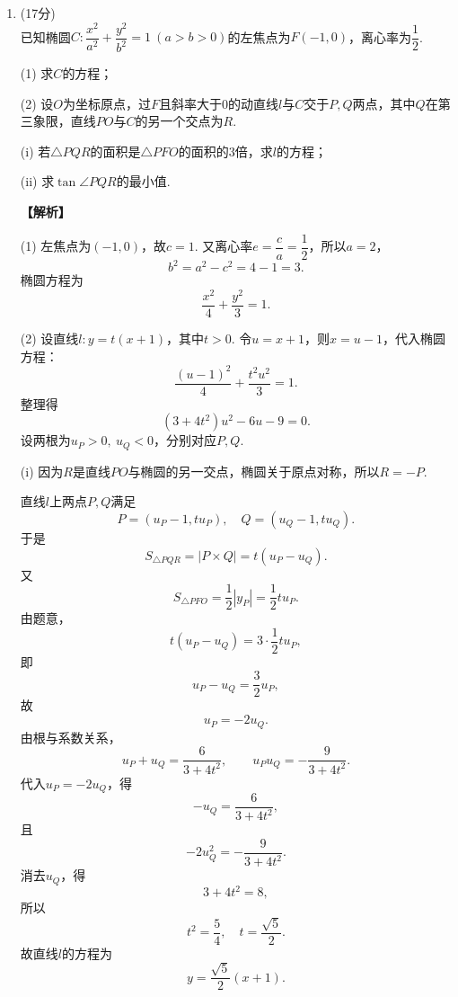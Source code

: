 \documentclass[12pt,a4paper]{article}
\begin{document}
\begin{enumerate}[leftmargin=*,label=\arabic*.,resume,itemsep=1.2ex]
		\textbf{【解析】}
		
		(1) 当$X=1,2,3$时，表示第$1,2,3$次首次投中；当$X=4$时，表示前三次均未投中. 故
		\[
		P(X=1)=\frac13,
		\]
		\[
		P(X=2)=\frac23\cdot\frac13=\frac29,
		\]
		\[
		P(X=3)=\left(\frac23\right)^2\cdot\frac13=\frac4{27},
		\]
		\[
		P(X=4)=\left(\frac23\right)^3=\frac8{27}.
		\]
		分布列为
		\[
		\begin{array}{c|cccc}
			X & 1 & 2 & 3 & 4\\ \hline
			P & \dfrac13 & \dfrac29 & \dfrac4{27} & \dfrac8{27}
		\end{array}
		\]
		
		(2)(i) $X>k$表示前$k$次均未投中，因此
		\[
		\boxed{P(X>k)=(1-p)^k}.
		\]
		
		(ii) 当$k+m\le N-1$时，由(i)得
		\[
		P(X>k+m)=(1-p)^{k+m},\qquad P(X>k)=(1-p)^k.
		\]
		所以
		\[
		P(X>k+m\mid X>k)
		=\frac{P(X>k+m)}{P(X>k)}
		=\frac{(1-p)^{k+m}}{(1-p)^k}
		=(1-p)^m
		=P(X>m).
		\]
		证毕.
		
		\item (17分)\\
		已知椭圆$C:\dfrac{x^2}{a^2}+\dfrac{y^2}{b^2}=1\ (a>b>0)$的左焦点为$F(-1,0)$，离心率为$\dfrac12$.
		
		(1) 求$C$的方程；
		
		(2) 设$O$为坐标原点，过$F$且斜率大于$0$的动直线$l$与$C$交于$P,Q$两点，其中$Q$在第三象限，直线$PO$与$C$的另一个交点为$R$.
		
		\hspace*{2em}(i) 若$\triangle PQR$的面积是$\triangle PFO$的面积的$3$倍，求$l$的方程；
		
		\hspace*{2em}(ii) 求$\tan\angle PQR$的最小值.
		
		\textbf{【解析】}
		
		(1) 左焦点为$(-1,0)$，故$c=1$. 又离心率$e=\dfrac ca=\dfrac12$，所以$a=2$，
		\[
		b^2=a^2-c^2=4-1=3.
		\]
		椭圆方程为
		\[
		\boxed{\frac{x^2}{4}+\frac{y^2}{3}=1}.
		\]
		
		(2) 设直线$l:y=t(x+1)$，其中$t>0$. 令$u=x+1$，则$x=u-1$，代入椭圆方程：
		\[
		\frac{(u-1)^2}{4}+\frac{t^2u^2}{3}=1.
		\]
		整理得
		\[
		(3+4t^2)u^2-6u-9=0.
		\]
		设两根为$u_P>0,\ u_Q<0$，分别对应$P,Q$.
		
		(i) 因为$R$是直线$PO$与椭圆的另一交点，椭圆关于原点对称，所以$R=-P$.
		
		直线$l$上两点$P,Q$满足
		\[
		P=(u_P-1,tu_P),\quad Q=(u_Q-1,tu_Q).
		\]
		于是
		\[
		S_{\triangle PQR}=|P\times Q|=t(u_P-u_Q).
		\]
		又
		\[
		S_{\triangle PFO}=\frac12|y_P|=\frac12tu_P.
		\]
		由题意，
		\[
		t(u_P-u_Q)=3\cdot\frac12tu_P,
		\]
		即
		\[
		u_P-u_Q=\frac32u_P,
		\]
		故
		\[
		u_P=-2u_Q.
		\]
		由根与系数关系，
		\[
		u_P+u_Q=\frac6{3+4t^2},\qquad u_Pu_Q=-\frac9{3+4t^2}.
		\]
		代入$u_P=-2u_Q$，得
		\[
		-u_Q=\frac6{3+4t^2},
		\]
		且
		\[
		-2u_Q^2=-\frac9{3+4t^2}.
		\]
		消去$u_Q$，得
		\[
		3+4t^2=8,
		\]
		所以
		\[
		t^2=\frac54,\quad t=\frac{\sqrt5}{2}.
		\]
		故直线$l$的方程为
		\[
		\boxed{y=\frac{\sqrt5}{2}(x+1)}.
		\]
		

\end{enumerate}
\end{document}
